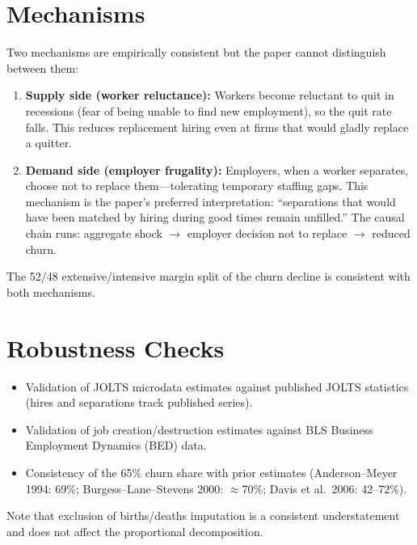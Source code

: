 \section{Mechanisms}

Two mechanisms are empirically consistent but the paper cannot distinguish
between them:

\begin{enumerate}
  \item \textbf{Supply side (worker reluctance):} Workers become reluctant to
    quit in recessions (fear of being unable to find new employment), so the
    quit rate falls. This reduces replacement hiring even at firms that would
    gladly replace a quitter.

  \item \textbf{Demand side (employer frugality):} Employers, when a worker
    separates, choose not to replace them---tolerating temporary staffing
    gaps. This mechanism is the paper's preferred interpretation: ``separations
    that would have been matched by hiring during good times remain unfilled.''
    The causal chain runs: aggregate shock $\to$ employer decision not to
    replace $\to$ reduced churn.
\end{enumerate}

The 52/48 extensive/intensive margin split of the churn decline is consistent
with both mechanisms.

\section{Robustness Checks}

\begin{itemize}
  \item Validation of JOLTS microdata estimates against published JOLTS
    statistics (hires and separations track published series).
  \item Validation of job creation/destruction estimates against BLS Business
    Employment Dynamics (BED) data.
  \item Consistency of the 65\% churn share with prior estimates (Anderson--Meyer
    1994: 69\%; Burgess--Lane--Stevens 2000: $\approx$70\%; Davis et al.\ 2006:
    42--72\%).
\end{itemize}

Note that exclusion of births/deaths imputation is a consistent understatement
and does not affect the proportional decomposition.

